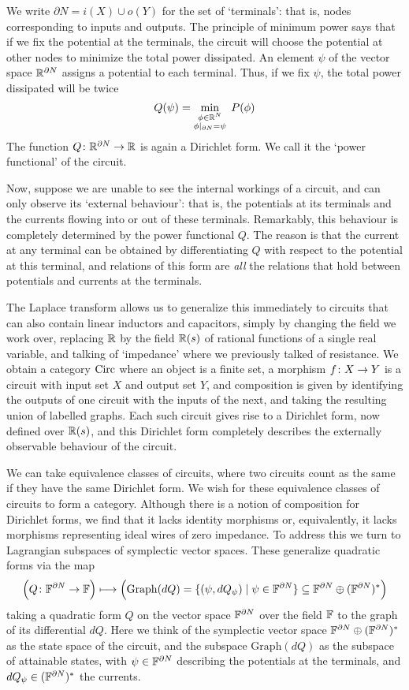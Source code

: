 We write $\partial N = i(X) \cup o(Y)$ for the set of `terminals': that is,
nodes corresponding to inputs and outputs.    The principle of minimum
power says that if we fix the potential at the terminals, the circuit will choose
the potential at other nodes to minimize the total power dissipated.   
An element $\psi$ of the vector space ${\mathbb{R}}^{\partial N}$ assigns a potential 
to each terminal.   Thus, if we fix $\psi$, the total power dissipated will be twice
\[
  Q(\psi) = \min_{\substack{ \phi \in {\mathbb{R}}^N \\ \phi\vert_{\partial N} = \psi}} \; P(\phi)  
\]
The function $Q {\colon} {\mathbb{R}}^{\partial N} \to {\mathbb{R}}$ is again a Dirichlet form.  We call it the `power functional' of the circuit.  

Now, suppose we are unable to see the internal workings of a circuit, and can only observe its `external behaviour': that is, the potentials at its terminals and the currents flowing into or out of these terminals.   Remarkably, this behaviour is completely determined by the power functional $Q$.  The reason is that the current at any terminal can be obtained by differentiating $Q$ with respect to the potential at this terminal, and relations of this form are \emph{all} the relations that hold between potentials and currents at the terminals.

The Laplace transform allows us to generalize this immediately to circuits that
can also contain linear inductors and capacitors, simply by changing the field we work over, replacing ${\mathbb{R}}$ by the field ${\mathbb{R}}(s)$ of rational functions of a single real variable,
and talking of `impedance' where we previously talked of resistance.  We obtain
a category $\mathrm{Circ}$ where an object is a finite set, a morphism $f {\colon} X \to Y$ is a circuit with input set $X$ and output set $Y$, and composition is given by identifying the outputs of one circuit with the inputs of the next, and taking the resulting union of labelled graphs.  Each such circuit gives rise to a Dirichlet form, now defined over
${\mathbb{R}}(s)$, and this Dirichlet form completely describes the externally observable
behaviour of the circuit.  

We can take equivalence classes of circuits, where two circuits count as the
same if they have the same Dirichlet form.  We wish for these equivalence classes of circuits to form a category. Although
there is a notion of composition for Dirichlet forms, we find that it lacks
identity morphisms or, equivalently, it lacks morphisms representing ideal wires
of zero impedance. To address this we turn to Lagrangian subspaces of
symplectic vector spaces.  These generalize quadratic forms via the map
\[
  \Big(Q{\colon} {\mathbb F}^{\partial N} \to {\mathbb F}\Big) \longmapsto \Big(\mathrm{Graph}(dQ) =
  \{(\psi, dQ_\psi) \mid \psi \in {\mathbb F}^{\partial N} \} \subseteq {\mathbb F}^{\partial
  N} \oplus ({\mathbb F}^{\partial N})^\ast\Big)
\]
taking a quadratic form $Q$ on the vector space ${\mathbb F}^{\partial N}$
over the field ${\mathbb F}$ to the graph
of its differential $dQ$. Here we think of the symplectic vector space
${\mathbb F}^{\partial N} \oplus ({\mathbb F}^{\partial N})^\ast$ as the state space of the
circuit, and the subspace $\mathrm{Graph}(dQ)$ as the subspace of attainable
states, with $\psi \in {\mathbb F}^{\partial N}$ describing the potentials at the
terminals, and $dQ_\psi \in ({\mathbb F}^{\partial N})^\ast$ the currents. 

